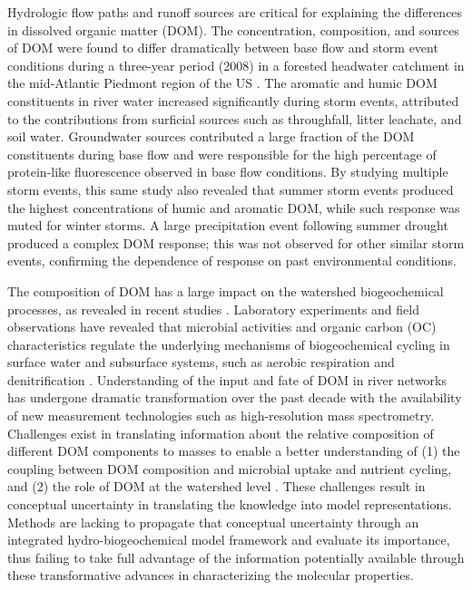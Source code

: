 \documentclass[preprint,review, 12pt]{elsarticle}
\begin{document}
Hydrologic flow paths and runoff sources are critical for explaining the differences in dissolved organic matter (DOM). The concentration, composition, and sources of DOM were found to differ dramatically between base flow and storm event conditions during a three{-}year period (2008) in a forested headwater catchment in the mid{‐}Atlantic Piedmont region of the US \citep{Inamdar2011}. The aromatic and humic DOM constituents in river water increased significantly during storm events, attributed to the contributions from surficial sources such as throughfall, litter leachate, and soil water. Groundwater sources contributed a large fraction of the DOM constituents during base flow and were responsible for the high percentage of protein‐like fluorescence observed in base flow conditions. By studying multiple storm events, this same study \citep{Inamdar2011} also revealed that summer storm events produced the highest concentrations of humic and aromatic DOM, while such response was muted for winter storms. A large precipitation event following summer drought produced a complex DOM response; this was not observed for other similar storm events, confirming the dependence of response on past environmental conditions. 

The composition of DOM has a large impact on the watershed biogeochemical processes, as revealed in recent studies \citep{Stegen2018,Goldman2017a,Graham2017d}. Laboratory experiments and field observations have revealed that microbial activities and organic carbon (OC) characteristics regulate the underlying mechanisms of biogeochemical cycling in surface water and subsurface systems, such as aerobic respiration and denitrification \citep{Stegen2018,Goldman2017a,Graham2017d}. Understanding of the input and fate of DOM in river networks has undergone dramatic transformation over the past decade with the availability of new measurement technologies such as high-resolution mass spectrometry. Challenges exist in translating information about the relative composition of different DOM components to masses to enable a better understanding of (1) the coupling between DOM composition and microbial uptake and nutrient cycling, and (2) the role of DOM at the watershed level \citep{Inamdar2011}. These challenges result in conceptual uncertainty in translating the knowledge into model representations. Methods are lacking to propagate that conceptual uncertainty through an integrated hydro-biogeochemical model framework and evaluate its importance, thus failing to take full advantage of the information potentially available through these transformative advances in characterizing the molecular properties.
            
\end{document}
